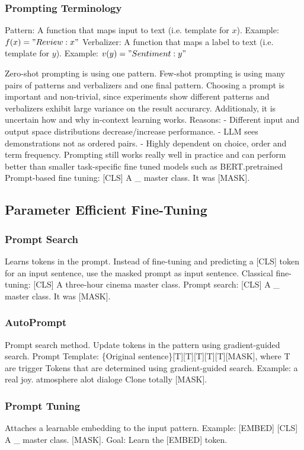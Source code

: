 \documentclass{scrartcl}
\begin{document}
\subsubsection*{Prompting Terminology}
Pattern:
A function that maps input to text (i.e. template for $x$).
Example: $f(x) = "Review: x"$
Verbalizer:
A function that maps a label to text (i.e. template for $y$).
Example: $v(y) = "Sentiment: y"$

Zero-shot prompting is using one pattern. Few-shot prompting is using many pairs of patterns and verbalizers and one final pattern.
Choosing a prompt is important and non-trivial, since experiments show different patterns and verbalizers exhibit large variance on the result accurarcy. Additionaly, it is uncertain how and why in-context learning works.
Reasons:
- Different input and output space distributions decrease/increase performance.
- LLM sees demonstrations not as ordered pairs.
- Highly dependent on choice, order and term frequency.
Prompting still works really well in practice and can perform better than smaller task-specific fine tuned models such as BERT.pretrained
Prompt-based fine tuning: [CLS] A \_ master class. It was [MASK].

\subsection*{Parameter Efficient Fine-Tuning}
\subsubsection*{Prompt Search}
Learns tokens in the prompt.
Instead of fine-tuning and predicting a [CLS] token for an input sentence, use the masked prompt as input sentence.
Classical fine-tuning: [CLS] A three-hour cinema master class.
Prompt search: [CLS] A \_ master class. It was [MASK].

\subsubsection*{AutoPrompt}
Prompt search method.
Update tokens in the pattern using gradient-guided search.
Prompt Template: \{Original sentence\}[T][T][T][T][T][MASK], where T are trigger Tokens that are determined using gradient-guided search.
Example: a real joy. atmosphere alot dialoge Clone totally [MASK].

\subsubsection*{Prompt Tuning}
Attaches a learnable embedding to the input pattern.
Example: [EMBED] [CLS] A \_ master class. [MASK].
Goal: Learn the [EMBED] token.
\end{document}

